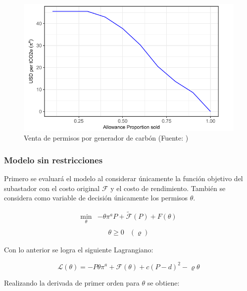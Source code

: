\begin{figure}[H]
    \centering
    \includegraphics[width=15cm]{docs/DocumentoMemoria/core/images/figura 6 amigo.png}
    \caption{Venta de permisos por generador de carbón (Fuente: \protect{})}
    \label{fig:fig6}
\end{figure}


\subsubsection{Modelo sin restricciones}

Primero se evaluará el modelo al considerar únicamente la función objetivo del subastador con el costo original $\mathcal{F}$ y el costo de rendimiento. También se considera como variable de decisión únicamente los permisos $\theta$.  

\begin{equation}
\begin{array}{rrclcl}
    \displaystyle \min_{\theta} & -\theta \pi^aP + \tilde{\mathcal{F}}(P)+F(\theta)  \label{fo:perfornorest}\\
\end{array}
\end{equation}
\begin{equation}
\begin{array}{cl}
    \theta \geq 0 & (\varrho)
\end{array}
\end{equation}

Con lo anterior se logra el siguiente Lagrangiano:

$$\mathcal{L}(\theta)=-P\theta\pi^a+\mathcal{F}(\theta)+c(P-d)^2 - \varrho\theta $$

Realizando la derivada de primer orden para $\theta$ se obtiene:

